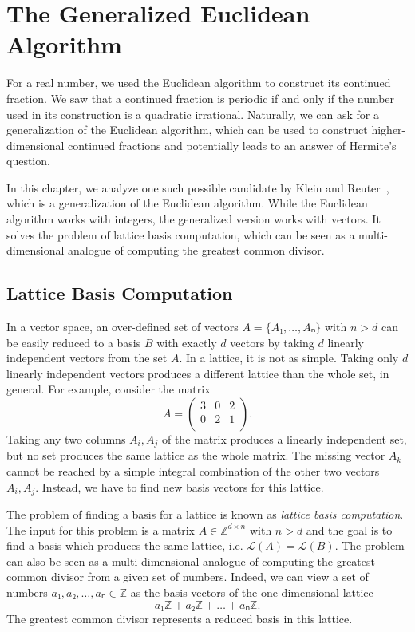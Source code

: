\chapter{The Generalized Euclidean Algorithm}
\label{ch:generalized-euclidean}

For a real number, we used the Euclidean algorithm to construct its continued
fraction.
We saw that a continued fraction is periodic if and only if the number used in
its construction is a quadratic irrational.
Naturally, we can ask for a generalization of the Euclidean algorithm,
which can be used to construct higher-dimensional continued fractions
and potentially leads to an answer of Hermite's question.

In this chapter, we analyze one such possible candidate by Klein and Reuter~\cite{Klein24},
which is a generalization of the Euclidean algorithm.
While the Euclidean algorithm works with integers,
the generalized version works with vectors.
It solves the problem of lattice basis computation,
which can be seen as a multi-dimensional analogue of computing the greatest
common divisor.

\section{Lattice Basis Computation}

In a vector space, an over-defined set of vectors $A = \{A₁, …, Aₙ\}$ with $n > d$
can be easily reduced to a basis $B$ with exactly $d$ vectors by taking $d$
linearly independent vectors from the set $A$.
In a lattice, it is not as simple.
Taking only $d$ linearly independent vectors produces a different lattice than
the whole set, in general.
For example, consider the matrix
\[
  A = \begin{pmatrix}
    3 & 0 & 2 \\
    0 & 2 & 1 \\
  \end{pmatrix}.
\]
Taking any two columns $A_i, A_j$ of the matrix produces a linearly independent
set, but no set produces the same lattice as the whole matrix.
The missing vector $A_k$ cannot be reached by a simple integral combination of the
other two vectors $A_i, A_j$.
Instead, we have to find new basis vectors for this lattice.

The problem of finding a basis for a lattice is known as \emph{lattice basis computation}.
The input for this problem is a matrix $A ∈ ℤ^{d×n}$ with $n > d$ and the goal
is to find a basis which produces the same lattice, i.e. $\mathcal L(A) = \mathcal L(B)$.
The problem can also be seen as a multi-dimensional analogue of
computing the greatest common divisor from a given set of numbers.
Indeed, we can view a set of numbers $a₁, a₂, …, aₙ ∈ ℤ$ as the basis vectors
of the one-dimensional lattice
\[
  a₁ℤ + a₂ ℤ + \dots + aₙ ℤ.
\]
The greatest common divisor represents a reduced basis in this lattice.


